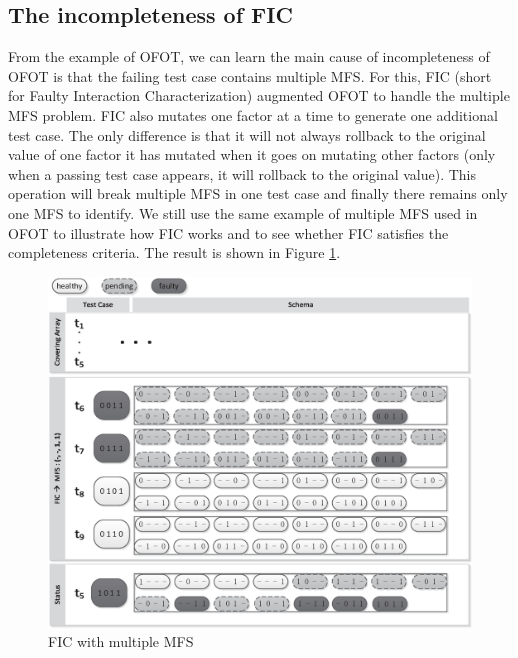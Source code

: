 \subsection{The incompleteness of FIC}

From the example of OFOT, we can learn the main cause of incompleteness of OFOT is that the failing test case contains multiple MFS. For this, FIC \cite{zhang2011characterizing} (short for Faulty Interaction Characterization) augmented OFOT to handle the multiple MFS problem.
FIC also mutates one factor at a time to generate one additional test case.  The only difference is that it will not always rollback to the original value of one factor it has mutated when it goes on mutating other factors (only when a passing test case appears, it will rollback to the original value). This operation will break multiple MFS in one test case and finally there remains only one MFS to identify. We still use the same example of multiple MFS used in OFOT to illustrate how FIC works and to see whether FIC satisfies the completeness criteria. The result is shown in Figure \ref{fig_fic_multi}.

\begin{figure}[!htb]
 \centering
 \includegraphics[width=5.3in]{fic.eps}
 \caption{FIC with multiple MFS}
 \label{fig_fic_multi}
\end{figure}

